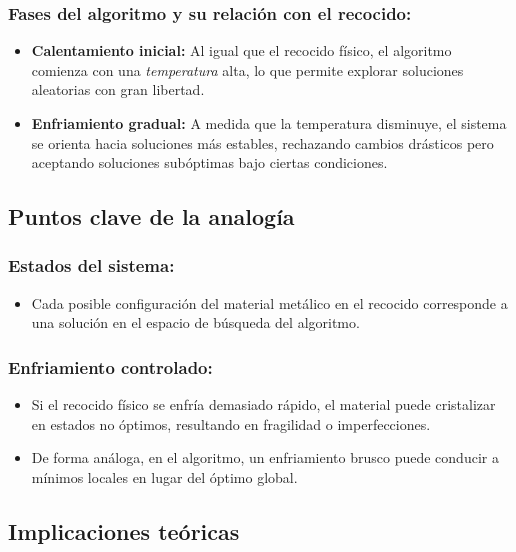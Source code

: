 \documentclass{article}
\begin{document}
\subsubsection{Fases del algoritmo y su relación con el recocido:}
\begin{itemize}
    \item \textbf{Calentamiento inicial:} Al igual que el recocido físico, el algoritmo comienza con una \textit{temperatura} alta, lo que permite explorar soluciones aleatorias con gran libertad.
    \item \textbf{Enfriamiento gradual:} A medida que la temperatura disminuye, el sistema se orienta hacia soluciones más estables, rechazando cambios drásticos pero aceptando soluciones subóptimas bajo ciertas condiciones.
\end{itemize}

\subsection{Puntos clave de la analogía}

\subsubsection{Estados del sistema:}
\begin{itemize}
    \item Cada posible configuración del material metálico en el recocido corresponde a una solución en el espacio de búsqueda del algoritmo.
\end{itemize}

\subsubsection{Enfriamiento controlado:}
\begin{itemize}
    \item Si el recocido físico se enfría demasiado rápido, el material puede cristalizar en estados no óptimos, resultando en fragilidad o imperfecciones.
    \item De forma análoga, en el algoritmo, un enfriamiento brusco puede conducir a mínimos locales en lugar del óptimo global.
\end{itemize}

\subsection{Implicaciones teóricas}
\end{document}
